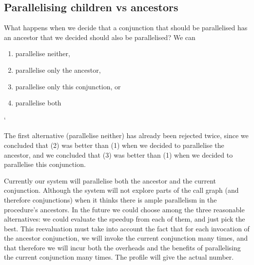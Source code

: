 %
%
%

\subsection{Parallelising children vs ancestors}
\label{sec:overlap_pragma_child_ancestor}

What happens when we decide that a conjunction that should be parallelised
has an ancestor that we decided should also be parallelised?
We can

\begin{enumerate}
\item parallelise neither,
\item parallelise only the ancestor,
\item parallelise only this conjunction, or
\item parallelise both
\end{enumerate}`

The first alternative (parallelise neither) has already been rejected twice,
since we concluded that (2) was better than (1)
when we decided to parallelise the ancestor,
and we concluded that (3) was better than (1)
when we decided to parallelise this conjunction.

Currently our system will parallelise both the ancestor and the current
conjunction.
Although the system will not explore parts of the call graph
(and therefore conjunctions)
when it thinks there is ample parallelism in the procedure's ancestors.
In the future we could choose among the three reasonable alternatives:
we could evaluate the speedup from each of them, and just pick the best.
This reevaluation must take into account
the fact that for each invocation of the ancestor conjunction,
we will invoke the current conjunction many times,
and that therefore we will incur both the overheads and the benefits
of parallelising the current conjunction many times.
The profile will give the actual number.

